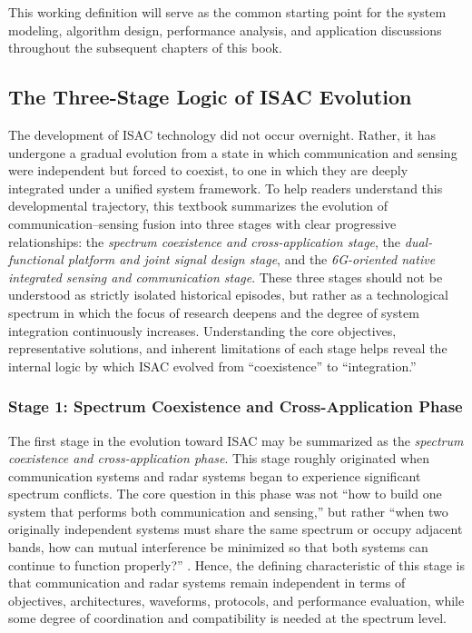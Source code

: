 This working definition will serve as the common starting point for the system modeling, algorithm design, performance analysis, and application discussions throughout the subsequent chapters of this book.

\subsection{The Three-Stage Logic of ISAC Evolution}
\label{subsec:ch1-evolution-logic}

The development of ISAC technology did not occur overnight. Rather, it has undergone a gradual evolution from a state in which communication and sensing were independent but forced to coexist, to one in which they are deeply integrated under a unified system framework. To help readers understand this developmental trajectory, this textbook summarizes the evolution of communication--sensing fusion into three stages with clear progressive relationships: the \emph{spectrum coexistence and cross-application stage}, the \emph{dual-functional platform and joint signal design stage}, and the \emph{6G-oriented native integrated sensing and communication stage}. These three stages should not be understood as strictly isolated historical episodes, but rather as a technological spectrum in which the focus of research deepens and the degree of system integration continuously increases. Understanding the core objectives, representative solutions, and inherent limitations of each stage helps reveal the internal logic by which ISAC evolved from ``coexistence'' to ``integration.''

\subsubsection{Stage 1: Spectrum Coexistence and Cross-Application Phase}
\label{subsubsec:ch1-stage1}

The first stage in the evolution toward ISAC may be summarized as the \emph{spectrum coexistence and cross-application phase}. This stage roughly originated when communication systems and radar systems began to experience significant spectrum conflicts. The core question in this phase was not ``how to build one system that performs both communication and sensing,'' but rather ``when two originally independent systems must share the same spectrum or occupy adjacent bands, how can mutual interference be minimized so that both systems can continue to function properly?'' \cite{Liu2020JointRadarComm,Chiriyath2017RadarCommCoexistence}. Hence, the defining characteristic of this stage is that communication and radar systems remain independent in terms of objectives, architectures, waveforms, protocols, and performance evaluation, while some degree of coordination and compatibility is needed at the spectrum level.

